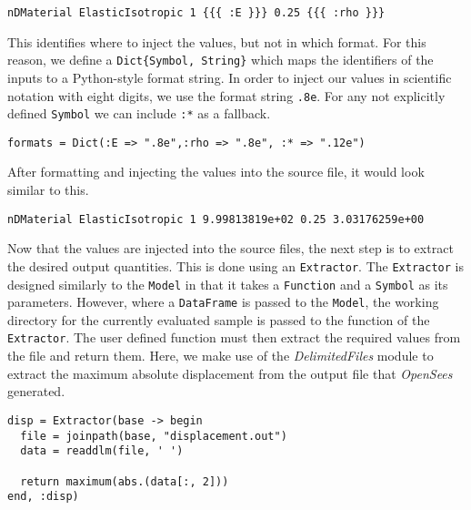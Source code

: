 \begin{verbatim}
nDMaterial ElasticIsotropic 1 {{{ :E }}} 0.25 {{{ :rho }}}
\end{verbatim}



This identifies where to inject the values, but not in which format. For this reason, we define a \texttt{Dict\{Symbol, String\}} which maps the identifiers of the inputs to a Python-style format string. In order to inject our values in scientific notation with eight digits, we use the format string \texttt{{\textquotedbl}.8e{\textquotedbl}}. For any not explicitly defined \texttt{Symbol} we can include \texttt{:*} as a fallback.




\begin{verbatim}
formats = Dict(:E => ".8e",:rho => ".8e", :* => ".12e")
\end{verbatim}



After formatting and injecting the values into the source file, it would look similar to this.




\begin{verbatim}
nDMaterial ElasticIsotropic 1 9.99813819e+02 0.25 3.03176259e+00
\end{verbatim}



Now that the values are injected into the source files, the next step is to extract the desired output quantities. This is done using an \texttt{Extractor}. The \texttt{Extractor} is designed similarly to the \texttt{Model} in that it takes a \texttt{Function} and a \texttt{Symbol} as its parameters. However, where a \texttt{DataFrame} is passed to the \texttt{Model}, the working directory for the currently evaluated sample is passed to the function of the \texttt{Extractor}. The user defined function must then extract the required values from the file and return them. Here, we make use of the \emph{DelimitedFiles} module to extract the maximum absolute displacement from the output file that \emph{OpenSees} generated.




\begin{verbatim}
disp = Extractor(base -> begin
  file = joinpath(base, "displacement.out")
  data = readdlm(file, ' ')

  return maximum(abs.(data[:, 2]))
end, :disp)
\end{verbatim}



